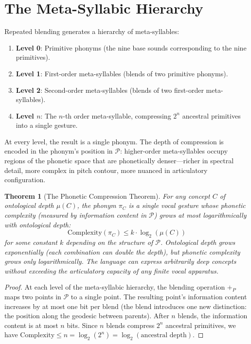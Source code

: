 \documentclass[12pt, letterpaper]{book}
\def\equiv{=}%
\def\oplus{+}%
\newtheorem{theorem}{Theorem}[chapter]
\begin{document}
\section{The Meta-Syllabic Hierarchy}

Repeated blending generates a hierarchy of meta-syllables:

\begin{enumerate}[label=(\roman*)]
    \item \textbf{Level 0}: Primitive phonyms (the nine base sounds corresponding to the nine primitives).
    \item \textbf{Level 1}: First-order meta-syllables (blends of two primitive phonyms).
    \item \textbf{Level 2}: Second-order meta-syllables (blends of two first-order meta-syllables).
    \item \textbf{Level $n$}: The $n$-th order meta-syllable, compressing $2^n$ ancestral primitives into a single gesture.
\end{enumerate}

At every level, the result is a single phonym. The depth of compression is encoded in the phonym's position in $\mathcal{P}$: higher-order meta-syllables occupy regions of the phonetic space that are phonetically denser---richer in spectral detail, more complex in pitch contour, more nuanced in articulatory configuration.

\begin{theorem}[The Phonetic Compression Theorem]\label{thm:phon-compress}
For any concept $C$ of ontological depth $\mu(C)$, the phonym $\pi_C$ is a single vocal gesture whose phonetic complexity (measured by information content in $\mathcal{P}$) grows at most logarithmically with ontological depth:
\[
\mathrm{Complexity}(\pi_C) \leq k \cdot \log_2(\mu(C))
\]
for some constant $k$ depending on the structure of $\mathcal{P}$. Ontological depth grows exponentially (each combination can double the depth), but phonetic complexity grows only logarithmically. The language can express arbitrarily deep concepts without exceeding the articulatory capacity of any finite vocal apparatus.
\end{theorem}

\begin{proof}
At each level of the meta-syllabic hierarchy, the blending operation $\oplus_P$ maps two points in $\mathcal{P}$ to a single point. The resulting point's information content increases by at most one bit per blend (the blend introduces one new distinction: the position along the geodesic between parents). After $n$ blends, the information content is at most $n$ bits. Since $n$ blends compress $2^n$ ancestral primitives, we have $\mathrm{Complexity} \leq n \equiv \log_2(2^n) \equiv \log_2(\text{ancestral depth})$.
\end{proof}
\end{document}
